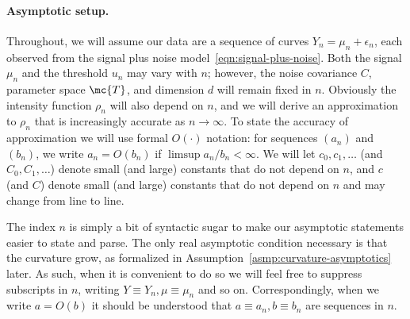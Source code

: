 \documentclass{article}
\begin{document}
	\paragraph{Asymptotic setup.}
	Throughout, we will assume our data are a sequence of curves $Y_n = \mu_n + \epsilon_n$, each observed from the signal plus noise model~\eqref{eqn:signal-plus-noise}. Both the signal $\mu_n$ and the threshold $u_n$ may vary with $n$; however, the noise covariance $C$, parameter space $\mc{T}$, and dimension $d$ will remain fixed in $n$. Obviously the intensity function $\rho_n$ will also depend on $n$, and we will derive an approximation to $\rho_n$ that is increasingly accurate as $n \to \infty$. To state the accuracy of approximation we will use formal $O(\cdot)$ notation: for sequences $(a_n)$ and $(b_n)$, we write $a_n = O(b_n)$ if $\limsup a_n/b_n < \infty$. We will let $c_0,c_1,\ldots$ (and $C_0,C_1,\ldots$) denote small (and large)  constants that do not depend on $n$, and $c$ (and $C$) denote small (and large) constants that do not depend on $n$ and may change from line to line.
	
	The index $n$ is simply a bit of syntactic sugar to make our asymptotic statements easier to state and parse. The only real asymptotic condition necessary is that the curvature grow, as formalized in Assumption~\ref{asmp:curvature-asymptotics} later. As such, when it is convenient to do so we will feel free to suppress subscripts in $n$, writing $Y \equiv Y_n, \mu \equiv \mu_n$ and so on. Correspondingly, when we write $a = O(b)$ it should be understood that $a \equiv a_n, b \equiv b_n$ are sequences in $n$.
	
\end{document}

